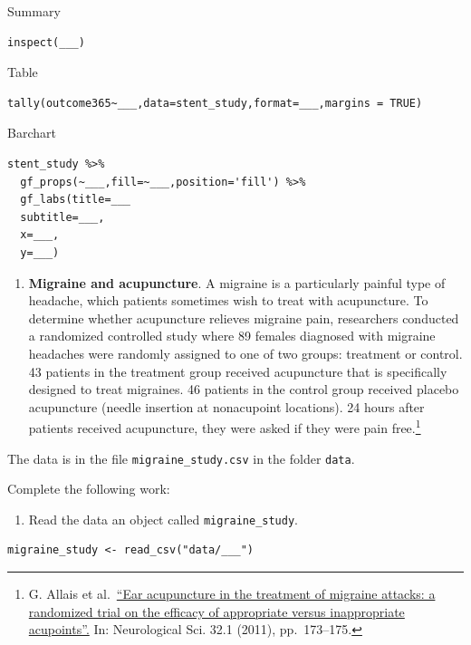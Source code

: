 \documentclass[
]{book}
\providecommand{\tightlist}{%
  \setlength{\itemsep}{0pt}\setlength{\parskip}{0pt}}
\begin{document}
Summary

\begin{verbatim}
inspect(___)
\end{verbatim}

Table

\begin{verbatim}
tally(outcome365~___,data=stent_study,format=___,margins = TRUE)
\end{verbatim}

Barchart

\begin{verbatim}
stent_study %>%
  gf_props(~___,fill=~___,position='fill') %>%
  gf_labs(title=___
  subtitle=___,
  x=___,
  y=___)
\end{verbatim}

\begin{enumerate}
\def\labelenumi{\arabic{enumi}.}
\setcounter{enumi}{1}
\tightlist
\item
  \textbf{Migraine and acupuncture}. A migraine is a particularly painful type of headache, which patients sometimes wish to treat with acupuncture. To determine whether acupuncture relieves migraine pain, researchers conducted a randomized controlled study where 89 females diagnosed with migraine headaches were randomly assigned to one of two groups: treatment or control. 43 patients in the treatment group received acupuncture that is specifically designed to treat migraines. 46 patients in the control group received placebo acupuncture (needle insertion at nonacupoint locations). 24 hours after patients received acupuncture, they were asked if they were pain free.\footnote{G. Allais et al.~\href{http://www.ncbi.nlm.nih.gov/pubmed/21533739}{``Ear acupuncture in the treatment of migraine attacks: a randomized trial on the efficacy of appropriate versus inappropriate acupoints''.} In: Neurological Sci. 32.1 (2011), pp.~173--175.}
\end{enumerate}

The data is in the file \texttt{migraine\_study.csv} in the folder \texttt{data}.

Complete the following work:

\begin{enumerate}
\def\labelenumi{\alph{enumi}.}
\tightlist
\item
  Read the data an object called \texttt{migraine\_study}.
\end{enumerate}

\begin{verbatim}
migraine_study <- read_csv("data/___")
\end{verbatim}
\end{document}
